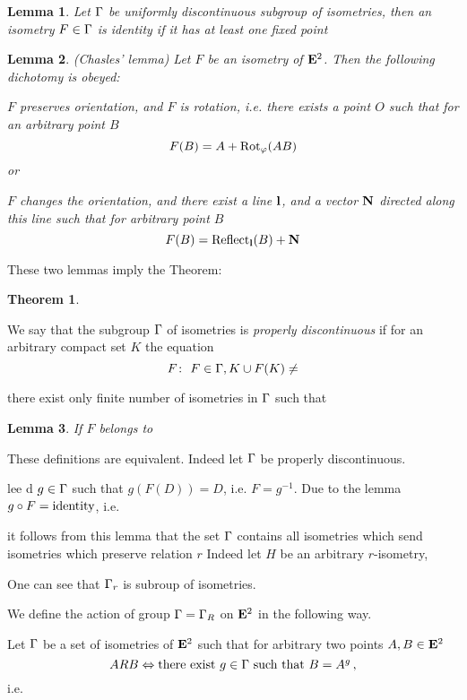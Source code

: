 \documentclass[12pt]{article}
\theoremstyle{theorem}
\newtheorem{thm}{Theorem}
\theoremstyle{lemma}
\newtheorem{lm}{Lemma}
\numberwithin{equation}{section}
\begin{document}
\begin{lm} Let ${\Gamma}$ be uniformly discontinuous
subgroup of isometries, then
an  isometry $F\in {\Gamma}$ is identity if it
has at least one fixed point    
\end{lm}


 \begin{lm}(Chasles' lemma)
Let $F$ be an isometry of ${\bf E}^2$.
  Then  the following dichotomy is obeyed:

 $F$ preserves orientation, and
 $F$ is rotation, i.e. there exists a point $O$ such that
   for an arbitrary point $B$
         $$
     F(B)=A+{\rm Rot}_\varphi(AB)
         $$             
or

  $F$ changes the orientation, and there exist a line $\bf l$,
and a vector ${\bf N}$ directed along this line 
         such that for arbitrary point $B$
           $$
F(B)={\rm Reflect}_{\bf l}(B)+{\bf N}
           $$

\end{lm}

These two lemmas imply the Theorem:

  \begin{thm}
   \end{thm}
We say that the subgroup ${\Gamma}$ of isometries
is {\it properly discontinuous} if for an arbitrary
compact set $K$ 
the equation
       $$
F\colon\,\, F\in\G, K\cup F(K)\not=\empty
       $$

there exist only finite number of
isometries in ${\Gamma}$ such that 
\begin{lm} If $F$ belongs to 
\end{lm}


These definitions are equivalent.
Indeed let ${\Gamma}$ be properly discontinuous.


 lee d $g\in {\Gamma}$
such that $g(F(D))=D$, i.e. $F=g^{-1}$.
Due to the lemma $g\circ F={\rm identity}$, i.e. 

it follows from this lemma that the set ${\Gamma}$ contains all 
isometries which send 
isometries which preserve relation $r$ Indeed let $H$ be an arbitrary $r$-isometry,
 


 
One can see that ${\Gamma}_r$ is subroup of isometries.





  We define the action of group ${\Gamma}={\Gamma}_R$ on ${\bf E}^2$
in the following way.



 Let ${\Gamma}$ be a set of isometries of ${\bf E}^2$ such that
for arbitrary two points $A,B\in {\bf E}^2$
      \begin{equation*}
      ARB \Leftrightarrow 
      \hbox{there exist $g\in {\Gamma}$ such that $B=A^g$}\,,
\end{equation*}
i.e. 
\end{document}
